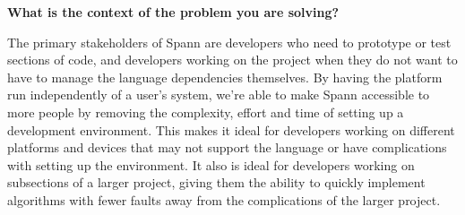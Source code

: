 \documentclass{article}
\begin{document}
\large
\textbf{What is the context of the problem you are solving?}\\
\normalsize

The primary stakeholders of Spann are developers who need to prototype or test
sections of code, and developers working on the project when they do not want
to have to manage the language dependencies themselves. By having the platform
run independently of a user’s system, we’re able to make Spann accessible to
more people by removing the complexity, effort and time of setting up a
development environment. This makes it ideal for developers working on
different platforms and devices that may not support the language or have
complications with setting up the environment. It also is ideal for developers
working on subsections of a larger project, giving them the ability to quickly
implement algorithms with fewer faults away from the complications of the
larger project.\\





\end{document}
